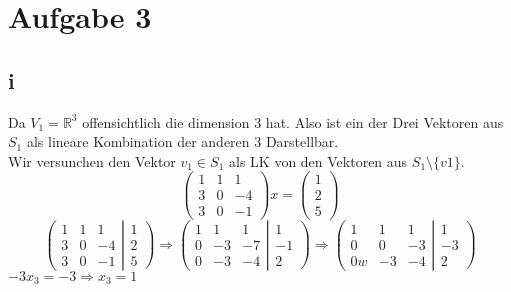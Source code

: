 \documentclass[10pt,a4paper]{article}
\begin{document}
\section{Aufgabe 3}
\subsection{i}
Da $V_1 = \mathbb{R}^3$ offensichtlich die dimension 3 hat. Also ist ein der Drei Vektoren aus $S_1$ als lineare Kombination der anderen 3 Darstellbar.\\
Wir versunchen den Vektor $v_1 \in S_1$ als LK von den Vektoren aus $S_1\setminus\{v1\}$.\\
$$\begin{pmatrix}
	1&1&1\\3&0&-4\\3&0&-1
  \end{pmatrix}x = 
  \begin{pmatrix}   
  	1\\2\\5 
  \end{pmatrix}
$$
$$\left(\begin{matrix}
		1 & 1 & 1 \\
		3 & 0 & -4\\
		3 & 0 & -1
  \end{matrix} \left|
  \begin{matrix}
   	1 \\ 2\\ 5 	
  \end{matrix}\right)\right.
  \Rightarrow
  \left(\begin{matrix}
		1 & 1 & 1 \\
		0 & -3 & -7\\
		0 & -3 & -4
  \end{matrix} \left|
  \begin{matrix}
   	1 \\ -1\\ 2 	
  \end{matrix}\right)\right.
  \Rightarrow
  \left(\begin{matrix}
		1 & 1 & 1 \\
		0 & 0 & -3\\
		0 w& -3 & -4
  \end{matrix} \left|
  \begin{matrix}
   	1 \\ -3\\ 2 	
  \end{matrix}\right)\right.
$$
$-3 x_3 = -3 \Rightarrow x_3= 1$\\
\end{document}
